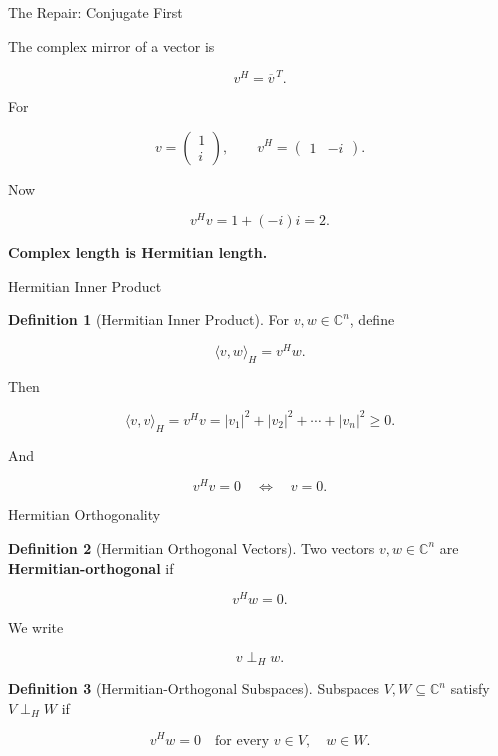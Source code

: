 \documentclass[10pt]{beamer}
\theoremstyle{definition}
\newtheorem{defi}{Definition}[section]
\newcommand{\x}[1]{\alert{\textbf{#1}}}
\newcommand{\perpH}{\perp_{H}}
\begin{document}
\begin{frame}{The Repair: Conjugate First}

The complex mirror of a vector is

$$
v^H=\overline{v}^{\,T}.
$$

\vfill

For

$$
v=\begin{pmatrix}1\\ i\end{pmatrix},
\qquad
v^H=\begin{pmatrix}1&-i\end{pmatrix}.
$$

\vfill

Now

$$
v^Hv=1+(-i)i=2.
$$

\vfill

\begin{center}
\x{Complex length is Hermitian length.}
\end{center}

\end{frame}

\begin{frame}{Hermitian Inner Product}

\begin{defi}[Hermitian Inner Product]
For $v,w\in\mathbb C^n$, define

$$
\langle v,w\rangle_H=v^Hw.
$$
\end{defi}

\vfill

Then

$$
\langle v,v\rangle_H
=v^Hv
=|v_1|^2+|v_2|^2+\cdots+|v_n|^2\ge0.
$$

\vfill

And

$$
v^Hv=0\quad\Longleftrightarrow\quad v=0.
$$

\end{frame}

\begin{frame}{Hermitian Orthogonality}

\begin{defi}[Hermitian Orthogonal Vectors]
Two vectors $v,w\in\mathbb C^n$ are \x{Hermitian-orthogonal} if

$$
v^Hw=0.
$$

We write

$$
v\perpH w.
$$
\end{defi}

\vfill

\begin{defi}[Hermitian-Orthogonal Subspaces]
Subspaces $V,W\subseteq\mathbb C^n$ satisfy $V\perpH W$ if

$$
v^Hw=0
\quad\text{for every }v\in V,
\quad w\in W.
$$
\end{defi}

\end{frame}
\end{document}
